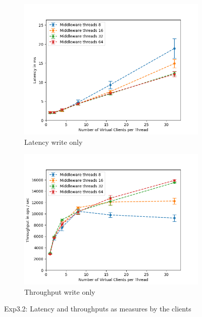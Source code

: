 \documentclass[11pt,a4paper]{article}
\begin{document}
\begin{figure}[H]
\centering
\begin{subfigure}{.5\textwidth}
    \centering
    \includegraphics[width=\textwidth]{img/exp3_2/exp3_2__latency_client_write_1.png}
    \caption{Latency write only}
    \label{fig:mesh1}
\end{subfigure}%
\begin{subfigure}{.5\textwidth}
      \centering
    \includegraphics[width=\textwidth]{img/exp3_2/exp3_2__throughput_client_write_1.png}
    \caption{Throughput write only}
    \label{fig:mesh1}
\end{subfigure}
\caption{Exp3.2: Latency and throughputs as measures by the clients}
\label{fig:test}
\end{figure}
\end{document}

